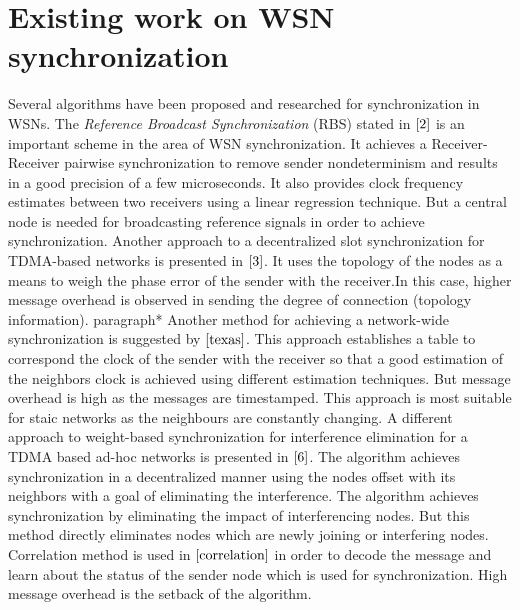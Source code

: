 \documentclass[a4paper,10pt]{report}
\begin{document}
\section{\textbf{Existing work on WSN synchronization}}\par
Several algorithms have been proposed and researched for synchronization in WSNs. The \textit{Reference Broadcast
Synchronization} (RBS) stated in $\cite{2}$ is an important scheme in the
area of WSN synchronization. It achieves a Receiver-Receiver pairwise synchronization to remove sender nondeterminism and results
in a good precision of a few microseconds. It also provides clock frequency estimates between two receivers using a linear regression
technique. But a central node is needed for broadcasting reference signals in order to achieve synchronization. Another approach to a decentralized slot synchronization for TDMA-based networks is presented in $\cite{3}$. It uses the topology of the nodes as a means to weigh the phase error of the sender with the receiver.In this case, higher message overhead is observed in sending the degree of connection (topology information).
paragraph*{} Another method for achieving a network-wide synchronization is suggested by $\cite{texas}$. This approach establishes a table to correspond the clock of the sender with the receiver so that a good estimation of the neighbors clock is achieved using different estimation techniques. But message overhead is high as the messages are timestamped. This approach is most suitable for staic networks as the neighbours are constantly changing. 
 A different  approach to weight-based synchronization for interference elimination for a TDMA based ad-hoc networks is presented in
$\cite{6}$. The algorithm achieves synchronization in a decentralized manner using the nodes offset with its neighbors with a goal of eliminating the interference. The algorithm achieves synchronization by eliminating the impact of interferencing nodes. But this method directly eliminates nodes which are newly joining or interfering nodes. Correlation method is used in $\cite{correlation}$ in order to decode the message and learn about the status of the sender node which is used for synchronization. High message overhead is the setback of the algorithm.
\end{document}
